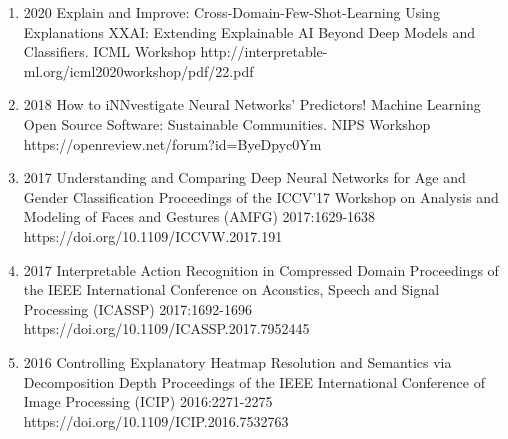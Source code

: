 \documentclass[10pt,a4paper]{article} %
\begin{document}
{\begin{enumerate}
        \item {}
                                {2020}
                                {Explain and Improve: Cross-Domain-Few-Shot-Learning Using Explanations}
                                {XXAI: Extending Explainable AI Beyond Deep Models and Classifiers. ICML Workshop}
                                {}
                                {http://interpretable-ml.org/icml2020workshop/pdf/22.pdf}


        \item {}
                                {2018}
                                {How to iNNvestigate Neural Networks' Predictors!}
                                {Machine Learning Open Source Software: Sustainable Communities. NIPS Workshop}
                                {}
                                {https://openreview.net/forum?id=ByeDpyc0Ym}


        \item {}
                                {2017}
                                {Understanding and Comparing Deep Neural Networks for Age and Gender Classification}
                                {Proceedings of the ICCV'17 Workshop on Analysis and Modeling of Faces and Gestures (AMFG)}
                                {2017:1629-1638}
                                {https://doi.org/10.1109/ICCVW.2017.191}

        \item {}
                                {2017}
                                {Interpretable Action Recognition in Compressed Domain}
                                {Proceedings of the IEEE International Conference on Acoustics, Speech and Signal Processing (ICASSP)}
                                {2017:1692-1696}
                                {https://doi.org/10.1109/ICASSP.2017.7952445}


        \item {}
                                {2016}
                                {Controlling Explanatory Heatmap Resolution and Semantics via Decomposition Depth}
                                {Proceedings of the IEEE International Conference of Image Processing (ICIP)}
                                {2016:2271-2275}
                                {https://doi.org/10.1109/ICIP.2016.7532763}



\end{enumerate}}
\end{document}
